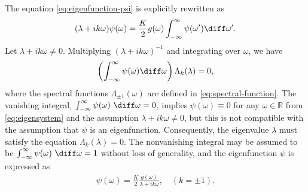 The equation \eqref{eq:eigenfunction-psi} is explicitly rewritten as
\begin{align}
  \label{eq:eigensystem}
  (\lambda + ik\omega) \psi(\omega)
  = \frac{K}{2} g(\omega) \int_{-\infty}^{\infty} \psi(\omega') \diff\omega'.
\end{align}
Let $\lambda+ik\omega\neq 0$.
Multiplying $(\lambda+ik\omega)^{-1}$ and integrating over $\omega$,
we have
\begin{align}
  \left( \int_{-\infty}^{\infty} \psi(\omega) \diff\omega \right)
  \Lambda_{k}(\lambda) = 0,
\end{align}
where the spectral functions $\Lambda_{\pm 1}(\omega)$
are defined in \eqref{eq:spectral-function}.
The vanishing integral,
$\int_{-\infty}^{\infty} \psi(\omega) ~\diff\omega=0$,
implies $\psi(\omega)\equiv 0$ for any $\omega\in\mathbb{R}$
from \eqref{eq:eigensystem} and the assumption $\lambda+ik\omega\neq 0$,
but this is not compatible with the assumption
that $\psi$ is an eigenfunction.
Consequently, the eigenvalue $\lambda$ must satisfy the equation 
$\Lambda_{k}(\lambda)=0$.
The nonvanishing integral may be assumed to be
$\int_{-\infty}^{\infty} \psi(\omega) ~\diff\omega=1$
without loss of generality,
and the eigenfunction $\psi$ is expressed as
\begin{align}
  \psi(\omega) = \frac{K}{2} \frac{g(\omega)}{\lambda+ik\omega},
  \quad
  (k=\pm 1).
  \label{eq:psi}
\end{align}



